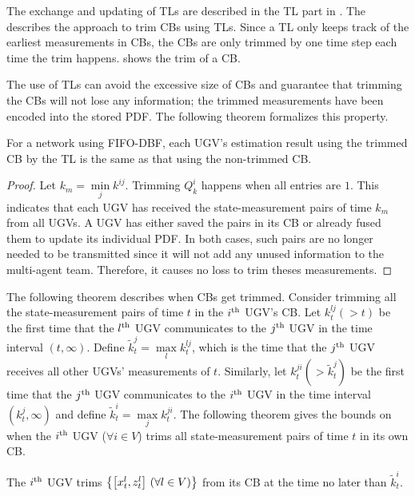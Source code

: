 	The exchange and updating of TLs are described in the TL part in .
	The  describes the approach to trim CBs using TLs.
	Since a TL only keeps track of the earliest measurements in CBs, the CBs are only trimmed by one time step each time the trim happens.
	 shows the trim of a CB.	
	
	The use of TLs can avoid the excessive size of CBs and guarantee that trimming the CBs will not lose any information; the trimmed measurements have been encoded into the stored PDF.
	The following theorem formalizes this property.
	
	\begin{thm}\label{thm:trim_no_loss}
		For a {\fc} network using FIFO-DBF, 
		each UGV's estimation result using the trimmed CB by the TL is the same as that using the non-trimmed CB.
	\end{thm}
	
	\begin{proof}
		
		Let $k_m=\min\limits_j k^{ij}$. 
		Trimming $Q^i_k$ happens when all entries are $1$. 
		This indicates that each UGV has received the state-measurement pairs of time $k_m$ from all UGVs.
		A UGV has either saved the pairs in its CB or already fused them to update its individual PDF.
		In both cases, such pairs are no longer needed to be transmitted since it will not add any unused information to the multi-agent team. 
		Therefore, it causes no loss to trim theses measurements.
	\end{proof}
	
	The following theorem describes when CBs get trimmed.
	Consider trimming all the state-measurement pairs of time $t$ in the $i^\text{th}$ UGV's CB.
	Let $k^{lj}_t (>t)$ be the first time that the $l^\text{th}$ UGV communicates to the $j^\text{th}$ UGV in the time interval $(t,\infty)$.
	Define $\tilde{k}^j_t=\max\limits_l k^{lj}_t$, which is the time that the $j^\text{th}$ UGV receives all other UGVs' measurements of $t$.
	Similarly, let $k^{ji}_t (> \tilde{k}^j_t)$ be the first time that the $j^\text{th}$ UGV communicates to the $i^\text{th}$ UGV in the time interval $(k^j_t,\infty)$ and define $\tilde{k}^i_t=\max\limits_j k^{ji}_t$.
	The following theorem gives the bounds on when the $i^\text{th}$ UGV ($\forall i\in V$) trims all state-measurement pairs of time $t$ in its own CB.
	\begin{thm}\label{thm:upd_tl_freq}		
		The $i^\text{th}$ UGV trims $\left\lbrace\left[x^l_t,z^l_t\right] \,(\forall l\in V)\right\rbrace$ from its CB at the time no later than $\tilde{k}^i_t$.
	\end{thm}
	
